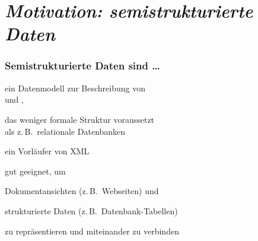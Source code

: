   \section[\protect\emph{Motivation}]{\protect\emph{Motivation: semistrukturierte Daten}}

    \begin{frame}
      \frametitle{Semistrukturierte Daten sind \dots}
      
      \begin{Itemize}
        \item
          ein Datenmodell zur Beschreibung von\\
           und ,
        \item[]
          das weniger formale Struktur voraussetzt \\
          als z.\,B.\ relationale Datenbanken
        \item
          ein Vorläufer von XML
        \item
          gut geeignet, um 
          \begin{Itemize}
            \item
              Dokumentansichten (z.\,B.\ Webseiten) und
            \item
              strukturierte Daten (z.\,B.\ Datenbank-Tabellen)
          \end{Itemize}
          zu repräsentieren und miteinander zu verbinden
      \end{Itemize}

    \end{frame}


